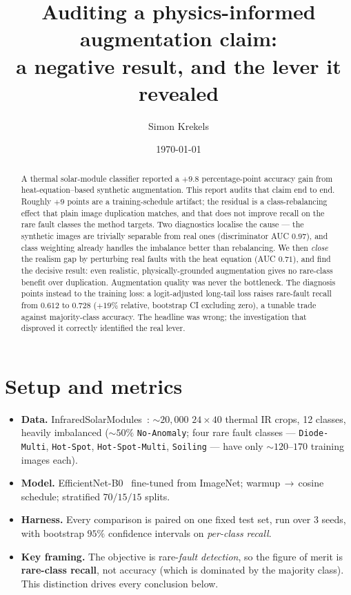 \documentclass[a4paper]{article}
\title{Auditing a physics-informed augmentation claim:\\
a negative result, and the lever it revealed}
\author{Simon Krekels}
\date{\today}
\begin{document}
\maketitle

\begin{abstract}
A thermal solar-module classifier reported a $+9.8$ percentage-point accuracy
gain from heat-equation--based synthetic augmentation. This report audits that
claim end to end. Roughly $+9$ points are a training-schedule artifact; the
residual is a class-rebalancing effect that plain image duplication matches, and
that does not improve recall on the rare fault classes the method targets. Two
diagnostics localise the cause --- the synthetic images are trivially separable
from real ones (discriminator AUC $0.97$), and class weighting already handles
the imbalance better than rebalancing. We then \emph{close} the realism gap by
perturbing real faults with the heat equation (AUC $0.71$), and find the decisive
result: even realistic, physically-grounded augmentation gives no rare-class
benefit over duplication. Augmentation quality was never the bottleneck. The
diagnosis points instead to the training loss: a logit-adjusted long-tail loss
raises rare-fault recall from $0.612$ to $0.728$ ($+19\%$ relative, bootstrap CI
excluding zero), a tunable trade against majority-class accuracy. The headline
was wrong; the investigation that disproved it correctly identified the real
lever.
\end{abstract}

\section{Setup and metrics}
\begin{itemize}
  \item \textbf{Data.} InfraredSolarModules~\cite{raptormaps2020infrared}:
        $\sim\!20{,}000$ $24\times40$ thermal IR crops, 12 classes, heavily
        imbalanced ($\sim\!50\%$ \texttt{No-Anomaly}; four rare fault classes
        --- \texttt{Diode-Multi}, \texttt{Hot-Spot}, \texttt{Hot-Spot-Multi},
        \texttt{Soiling} --- have only $\sim\!120$--$170$ training images each).
  \item \textbf{Model.} EfficientNet-B0~\cite{tan2019efficientnet} fine-tuned
        from ImageNet; warmup\,$\to$\,cosine schedule; stratified $70/15/15$
        splits.
  \item \textbf{Harness.} Every comparison is paired on one fixed test set, run
        over 3 seeds, with bootstrap $95\%$ confidence intervals on
        \emph{per-class recall}.
  \item \textbf{Key framing.} The objective is rare-\emph{fault detection}, so
        the figure of merit is \textbf{rare-class recall}, not accuracy (which is
        dominated by the majority class). This distinction drives every
        conclusion below.
\end{itemize}
\end{document}
